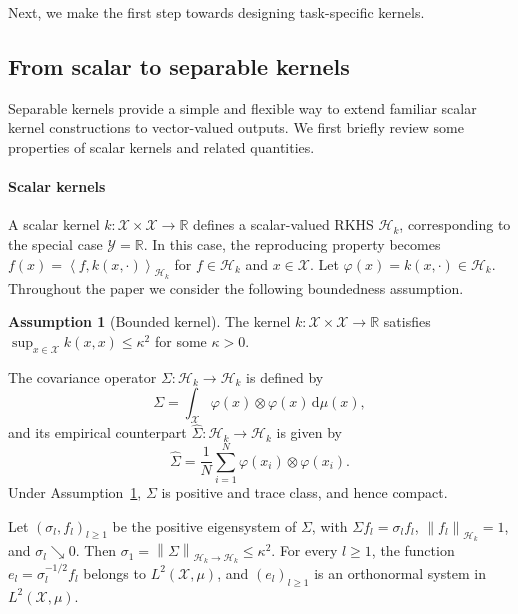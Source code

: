 \documentclass[11pt]{article}
\numberwithin{equation}{section}
\theoremstyle{plain}
\theoremstyle{definition}
\newtheorem{assumption}[theorem]{Assumption}
\theoremstyle{remark}
\newcommand{\X}{\mathcal{X}}
\newcommand{\Hs}{\mathcal{H}}
\newcommand{\Y}{\mathcal{Y}}
\newcommand{\Real}{\mathbb{R}}
\newcommand{\norm}[1]{\left\lVert#1\right\rVert}
\newcommand{\innerpro}[1]{\left\langle#1\right\rangle}
\begin{document}
Next, we make the  first step towards designing task-specific kernels.

\subsection{From scalar to separable kernels}

Separable kernels provide a simple and flexible way to extend familiar
scalar kernel constructions to vector-valued outputs. We first briefly review
some properties of scalar kernels and related quantities.

\paragraph{Scalar kernels}

A scalar kernel $k\colon\X\times\X\to\Real$ defines a scalar-valued RKHS
$\Hs_k$, corresponding to the special case $\Y=\Real$. In this case, the
reproducing property becomes
$f(x)=\innerpro{f,k(x,\cdot)}_{\Hs_k}$ for $f\in\Hs_k$ and $x\in\X$.
Let $\varphi(x)=k(x,\cdot)\in\Hs_k$.
Throughout the paper we consider the following boundedness assumption.

\begin{assumption}[Bounded kernel]\label{as:bounded_kernel}
The  kernel  $k\colon\X\times\X\to\Real$ satisfies
$\sup_{x\in\mathcal{X}} k(x,x)\leq\kappa^2$
for some $\kappa>0$.
\end{assumption}

The covariance operator
$\Sigma\colon\Hs_k\to\Hs_k$ is defined by
\[
\Sigma=\int_{\X}\varphi(x)\otimes\varphi(x)\,\mathrm{d}\mu(x),
\]
and its empirical counterpart
$\hat{\Sigma}\colon\Hs_k\to\Hs_k$ is given by
\[
\hat{\Sigma}
=
\frac{1}{N}\sum_{i=1}^N
\varphi(x_i)\otimes\varphi(x_i).
\]
Under Assumption~\ref{as:bounded_kernel}, $\Sigma$ is positive and trace class, and hence compact.

Let $(\sigma_l,f_l)_{l\geq1}$ be the positive eigensystem of $\Sigma$, with
$\Sigma f_l=\sigma_l f_l$, $\norm{f_l}_{\Hs_k}=1$, and
$\sigma_l\searrow0$. Then
$\sigma_1=\norm{\Sigma}_{\Hs_k\to\Hs_k}\leq\kappa^2$. For every $l\geq1$,
the function $e_l=\sigma_l^{-1/2}f_l$ belongs to
$L^2(\X,\mu)$, and $(e_l)_{l\geq1}$ is an orthonormal system in $L^2(\X,\mu)$.
\end{document}
